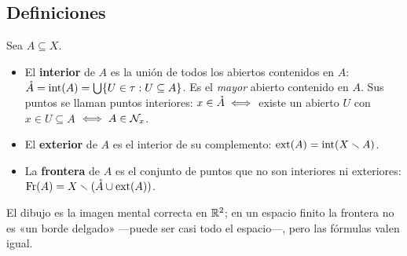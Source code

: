 \subsection{Definiciones}
\begin{definicion}
Sea $A\subseteq X$.
\begin{itemize}
\item El \textbf{interior} de $A$ es la unión de todos los abiertos contenidos en $A$:
$\mathring{A}=\operatorname{int}(A)=\bigcup\{U\in\tau: U\subseteq A\}$. Es el \emph{mayor} abierto contenido en $A$. Sus puntos se llaman
puntos interiores: $x\in\mathring{A}\iff$ existe un abierto $U$ con $x\in U\subseteq A$ $\iff A\in\mathcal{N}_x$.
\item El \textbf{exterior} de $A$ es el interior de su complemento: $\operatorname{ext}(A)=\operatorname{int}(X\smallsetminus A)$.
\item La \textbf{frontera} de $A$ es el conjunto de puntos que no son interiores ni exteriores:
$\operatorname{Fr}(A)=X\smallsetminus(\mathring{A}\cup\operatorname{ext}(A))$.
\end{itemize}
\end{definicion}
\begin{center}
\end{center}
El dibujo es la imagen mental correcta en $\mathbb{R}^2$; en un espacio finito la frontera no es «un borde delgado» —puede
ser casi todo el espacio—, pero las fórmulas valen igual.

